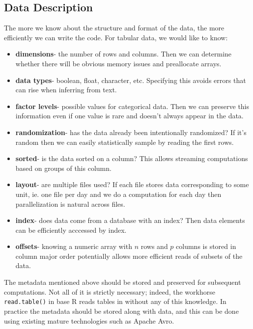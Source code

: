 \documentclass[12pt]{article}
\begin{document}
\subsection{Data Description}

The more we know about the structure and format of the data, the more
efficiently we can write the code. For tabular data, we would like to know:

\begin{itemize}
    \item \textbf{dimensions}- the number of rows and columns. Then we can determine
        whether there will be obvious memory issues and preallocate arrays.
    \item \textbf{data types}- boolean, float, character, etc. Specifying this avoids errors
        that can rise when inferring from text.
    \item \textbf{factor levels}- possible values for categorical data.
        Then we can preserve this information even if one value is rare and
        doesn't always appear in the data.
    \item \textbf{randomization}- has the data already been intentionally randomized?
        If it's random then we can easily statistically sample by reading
        the first rows.
    \item \textbf{sorted}- is the data sorted on a column? This allows
        streaming computations based on groups of this column.
    \item \textbf{layout}- are multiple files used? If each file stores
        data corresponding to some unit, ie. one file per day and we do a
        computation for each day then parallelization is natural across
        files.
    \item \textbf{index}- does data come from a database with an index?
        Then data elements can be efficiently acccessed by index.
    \item \textbf{offsets}- knowing a numeric array with $n$ rows and $p$
        columns is stored in column major order potentially allows more
        efficient reads of subsets of the data.
\end{itemize}

The metadata mentioned above should be stored and preserved for subsequent
computations. Not all of it is strictly necessary; indeed, the workhorse
\texttt{read.table()} in base R reads tables in without any of this
knowledge. In practice the metadata should be stored along with data, and
this can be done using existing mature technologies such as Apache Avro.
\end{document}
